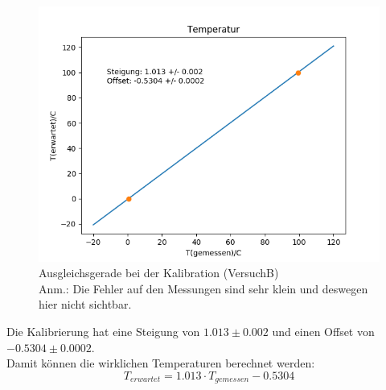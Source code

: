 \documentclass[12pt,a4paper]{article}
\begin{document}
\begin{figure}
\includegraphics[width=\linewidth]{Bilder/KalibrationB}
\begin{center}
\caption[KalibrationB]{Ausgleichsgerade bei der Kalibration (VersuchB)\\
Anm.: Die Fehler auf den Messungen sind sehr klein und deswegen hier nicht sichtbar.}
\label{fig:GeradeKaliB}
\end{center}
\end{figure}

Die Kalibrierung hat eine Steigung von $1.013\pm 0.002$ und einen Offset von $-0.5304\pm 0.0002$.\\
Damit können die wirklichen Temperaturen berechnet werden:
\begin{equation}
T_{erwartet}=1.013\cdot T_{gemessen}-0.5304
\end{equation}
\end{document}
